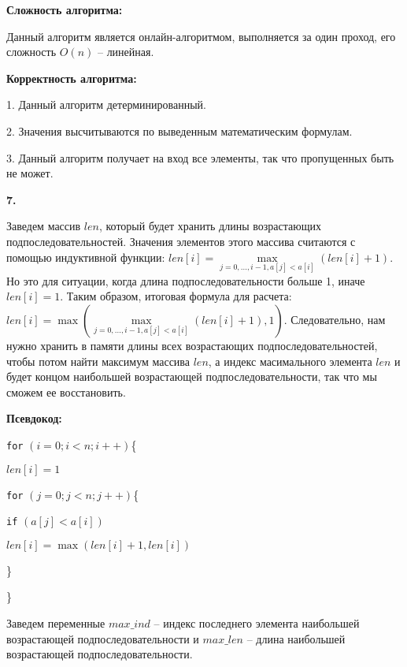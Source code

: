 \documentclass[12pt]{extreport}
\begin{document}
	\bigskip
	
	{\bf Сложность алгоритма:}	
	
	Данный алгоритм является онлайн-алгоритмом, выполняется за один проход, его сложность $O(n)$ -- линейная. 
	
	\bigskip
	
	{\bf Корректность алгоритма:}	
	
	1. Данный алгоритм детерминированный. 
	
	2. Значения высчитываются по выведенным математическим формулам. 
	
	3. Данный алгоритм получает на вход все элементы, так что пропущенных быть не может.
	
	\bigskip
	
	{\bf 7.}
	
	Заведем массив $len$, который будет хранить длины возрастающих подпоследовательностей. Значения элементов этого массива считаются с помощью индуктивной функции: $len[i] = \max \limits_{j=0, ..., i-1, a[j] < a[i]} (len[i] + 1)$. Но это для ситуации, когда длина подпоследовательности больше 1, иначе $len[i] = 1$. Таким образом, итоговая формула для расчета: $len[i] = \max(\max \limits_{j=0, ..., i-1, a[j] < a[i]} (len[i] + 1), 1)$. Следовательно, нам нужно хранить в памяти длины всех возрастающих подпоследовательностей, чтобы потом найти максимум массива $len$, а индекс масимального элемента $len$ и будет концом наибольшей возрастающей подпоследовательности, так что мы сможем ее восстановить. 
	
	{\bf Псевдокод:}
	
	{\tt for} $(i=0; i<n; i++) $\{
	
	\hspace{4 mm} $len[i] = 1$
	
	\hspace{4 mm} 	{\tt for} $(j=0; j<n; j++)$\{
	
	\hspace{8 mm} {\tt if} $ (a[j] < a[i])$
	
	\hspace{16 mm} $len[i] = \max (len[i] + 1, len[i])$
	
	\hspace{8 mm}  \}
	
	\hspace{4 mm} \}
	
	Заведем переменные $max\_ind$ -- индекс последнего элемента наибольшей возрастающей подпоследовательности и $max\_len$ -- длина наибольшей возрастающей подпоследовательности. 
	
\end{document}
